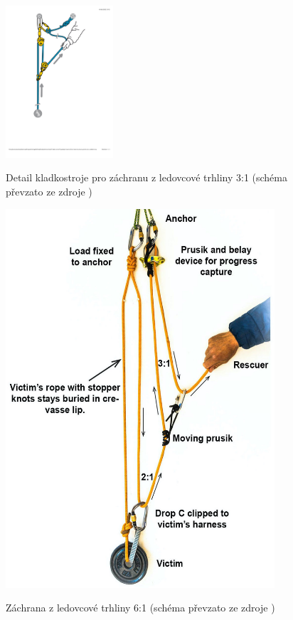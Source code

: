 \begin{figure}[h]
    \centering
    {\includegraphics[width=4.0cm]{Figures/Crevasse/2_Petzl_Crevasse_haul_system_3_1_detail.pdf}}%
    \caption[Crevasse 3:1 detail]{Detail kladkostroje pro záchranu z ledovcové trhliny 3:1 (schéma převzato ze zdroje \cite{Petzl_2022})}
    \label{Obr:Crevasse_3:1_detail}
\end{figure}
\begin{figure}[h]
    \centering
    {\includegraphics[width=10.0cm]{Figures/Crevasse/3_Crevasse_haul_system_6_1.jpg}}%
    \caption[Crevasse 6:1]{Záchrana z ledovcové trhliny 6:1 (schéma převzato ze zdroje \cite{stock_alpine_2022})}
    \label{Obr:Crevasse_6:1}
\end{figure}
